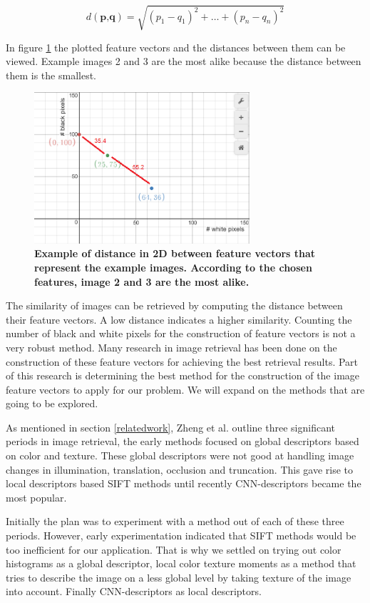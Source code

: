 \documentclass{article}
\begin{document}
\[d(\textbf{p,q}) = \sqrt{(p_1 - q_1)^2 + \dots + (p_n - q_n)^2} \]

In figure \ref{fig:distanceexample} the plotted feature vectors and the distances between them can be viewed. Example images 2 and 3 are the most alike because the distance between them is the smallest. 

\begin{figure}[H]
	\includegraphics[width=8cm]{images/distanceexample.png}
	\centering
	\caption{\textbf{Example of distance in 2D between feature vectors that represent the example images. According to the chosen features, image 2 and 3 are the most alike.}}
	\label{fig:distanceexample}
\end{figure}

The similarity of images can be retrieved by computing the distance between their feature vectors. A low distance indicates a higher similarity. Counting the number of black and white pixels for the construction of feature vectors is not a very robust method. Many research in image retrieval has been done on the construction of these feature vectors for achieving the best retrieval results. Part of this research is determining the best method for the construction of the image feature vectors to apply for our problem. We will expand on the methods that are going to be explored. 

As mentioned in section \ref{relatedwork}, Zheng et al. \cite{zheng2018sift} outline three significant periods in image retrieval, the early methods focused on global descriptors based on color and texture. These global descriptors were not good at handling image changes in illumination, translation, occlusion and truncation. This gave rise to local descriptors based SIFT methods until recently CNN-descriptors became the most popular. 

Initially the plan was to experiment with a method out of each of these three periods. However, early experimentation indicated that SIFT methods would be too inefficient for our application. That is why we settled on trying out color histograms as a global descriptor, local color texture moments \cite{yu2002colortexturemoments} as a method that tries to describe the image on a less global level by taking texture of the image into account. Finally CNN-descriptors as local descriptors.
\end{document}
